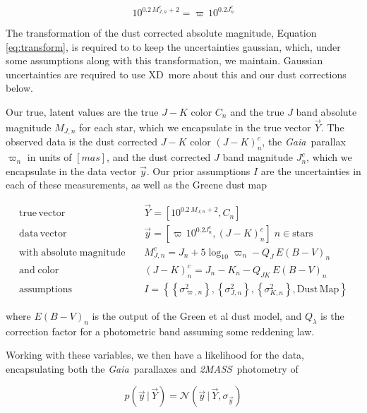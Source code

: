 \documentclass[modern]{aastex61}
\newcommand{\acronym}[1]{{\small{#1}}}
\newcommand{\project}[1]{\textsl{#1}}
\newcommand{\tmass}{\project{\acronym{2MASS}}}
\newcommand{\gaia}{\project{Gaia}}
\newcommand{\xd}{\acronym{XD}}
\newcommand{\given}{\,|\,}
\begin{document}
\begin{equation}
10^{0.2\,M^c_{J,n} + 2} = \varpi\,10^{0.2J^c_n}
\label{eq:transform}
\end{equation}

The transformation of the dust corrected absolute magnitude, Equation \ref{eq:transform}, is required to to keep the uncertainties gaussian, which, under some assumptions along with this transformation, we maintain. Gaussian uncertainties are required to use \xd\, more about this and our dust corrections below.

Our true, latent values are the true $J-K$ color $C_n$ and the true $J$ band absolute magnitude $M_{J,n}$ for each star, which we encapsulate in the true vector $\vec{Y}$. The observed data is the dust corrected $J-K$ color $(J-K)^c_n$, the \gaia\ parallax $\varpi_n$ in units of $[mas]$, and the dust corrected $J$ band magnitude $J^c_n$, which we encapsulate in the data vector $\vec{y}$. Our prior assumptions $I$ are the uncertainties in each of these measurements, as well as the Greene dust map

\begin{equation}
\begin{aligned}
\mathrm{true \, vector} \;\;\;\; &\vec{Y} = [10^{0.2\,M_{J,n} + 2}, C_n] \\
\mathrm{data \, vector} \;\;\;\; &\vec{y} = [\varpi\,10^{0.2J^c_n}, (J- K)^c_n] \;  n \in \mathrm{stars} \\
\mathrm{with \; absolute \; magnitude} \;\;\;\; &M^c_{J,n} = J_n + 5\log_{10}\varpi_n - Q_J\,E(B-V)_n \\
\mathrm{and \; color} \;\;\;\; &(J - K)^c_n = J_n - K_n - Q_{JK}\,E(B-V)_n \\
\mathrm{assumptions} \;\;\;\; &I = \left\{\left\{\sigma^2_{\varpi, n}\right\}, \left\{\sigma^2_{J,n}\right\}, \left\{\sigma^2_{K,n}\right\}, \mathrm{Dust \, Map}\right\}
\end{aligned}
\label{eq:data}
\end{equation}

where $E(B-V)_n$ is the output of the Green et al dust model, and $Q_{\lambda}$ is the correction factor for a photometric band assuming some reddening law.

Working with these variables, we then have a likelihood for the data, encapsulating both the \gaia\ parallaxes and \tmass\ photometry of

\begin{equation}
p(\vec{y} \given \vec{Y}) = \mathcal{N}(\vec{y} \given \vec{Y}, \sigma_{\vec{y}})
\label{eq:fulllike}
\end{equation}
\end{document}
